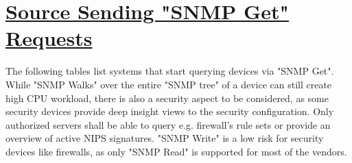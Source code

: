%
%
%

\chapter[Source Sending "SNMP Get" Requests]{\underline{Source Sending "SNMP Get" Requests}}
\begin{flushleft}
The following tables list systems that start querying devices via "SNMP Get". While "SNMP Walks" over the entire "SNMP tree" of a device can still create high CPU workload, there is also a security aspect to be considered, as some security devices provide deep insight views to the security configuration. Only authorized servers shall be able to query e.g. firewall’s rule sets or provide an overview of active NIPS signatures. "SNMP Write" is a low risk for security devices like firewalls, as only "SNMP Read" is supported for most of the vendors.
\end{flushleft}

